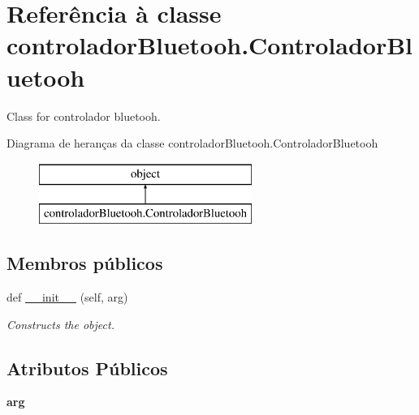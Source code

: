 \hypertarget{classcontrolador_bluetooh_1_1_controlador_bluetooh}{}\section{Referência à classe controlador\+Bluetooh.\+Controlador\+Bluetooh}
\label{classcontrolador_bluetooh_1_1_controlador_bluetooh}


Class for controlador bluetooh.  


Diagrama de heranças da classe controlador\+Bluetooh.\+Controlador\+Bluetooh\begin{figure}[H]
\begin{center}
\leavevmode
\includegraphics[height=2.000000cm]{classcontrolador_bluetooh_1_1_controlador_bluetooh}
\end{center}
\end{figure}
\subsection*{Membros públicos}
\begin{DoxyCompactItemize}
\item 
def \hyperlink{classcontrolador_bluetooh_1_1_controlador_bluetooh_a6b01f46d49cd95528274c008261fcf8d}{\+\_\+\+\_\+init\+\_\+\+\_\+} (self, arg)
\begin{DoxyCompactList}\small\item\em Constructs the object. \end{DoxyCompactList}\end{DoxyCompactItemize}
\subsection*{Atributos Públicos}
\begin{DoxyCompactItemize}
\item 
{\bfseries arg}\hypertarget{classcontrolador_bluetooh_1_1_controlador_bluetooh_ac15bab8b920b372149393c33bbb6a00d}{}\label{classcontrolador_bluetooh_1_1_controlador_bluetooh_ac15bab8b920b372149393c33bbb6a00d}

\end{DoxyCompactItemize}


